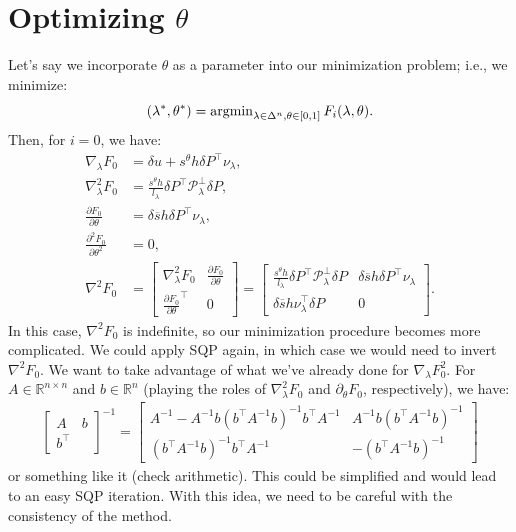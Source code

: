 \documentclass[eikonal.tex]{subfiles}
\begin{document}
\section{Optimizing $\theta$}

Let's say we incorporate $\theta$ as a parameter into our minimization
problem; i.e., we minimize:
\begin{equation}
  (\lambda^*, \theta^*) = \operatorname{argmin}_{\lambda \in \Delta^n, \theta \in [0, 1]} F_i(\lambda, \theta).
\end{equation}
Then, for $i = 0$, we have:
\begin{align*}
  \nabla_\lambda F_0 &= \delta u + s^\theta h \delta P^\top \nu_\lambda, \\
  \nabla_\lambda^2 F_0 &= \frac{s^\theta h}{l_\lambda} \delta P^\top \mathcal{P}_\lambda^\perp \delta P, \\
  \frac{\partial F_0}{\partial \theta} &= \delta \overline{s} h \delta P^\top \nu_\lambda, \\
  \frac{\partial^2 F_0}{\partial \theta^2} &= 0, \\
  \nabla^2 F_0 &= \begin{bmatrix}
    \nabla_\lambda^2 F_0 & \frac{\partial F_0}{\partial \theta} \\
    \frac{\partial F_0}{\partial \theta}^\top & 0
  \end{bmatrix} = \begin{bmatrix}
    \frac{s^\theta h}{l_\lambda} \delta P^\top \mathcal{P}_\lambda^\perp \delta P & \delta \overline{s} h \delta P^\top \nu_\lambda \\
    \delta \overline{s} h \nu_\lambda^\top \delta P  & 0
  \end{bmatrix}.
\end{align*}
In this case, $\nabla^2 F_0$ is indefinite, so our minimization
procedure becomes more complicated. We could apply SQP again, in which
case we would need to invert $\nabla^2 F_0$. We want to take advantage
of what we've already done for $\nabla_\lambda F_0^2$. For
$A \in \mathbb{R}^{n \times n}$ and $b \in \mathbb{R}^{n}$ (playing
the roles of $\nabla_\lambda^2 F_0$ and $\partial_\theta F_0$,
respectively), we have:
\begin{align*}
  \begin{bmatrix}
    A & b \\
    b^\top &
  \end{bmatrix}^{-1} = \begin{bmatrix}
    A^{-1} - A^{-1} b (b^\top A^{-1} b)^{-1} b^\top A^{-1} & A^{-1} b (b^\top A^{-1} b)^{-1} \\
    (b^\top A^{-1} b)^{-1} b^\top A^{-1} & -(b^\top A^{-1} b)^{-1}
  \end{bmatrix}
\end{align*}
or something like it (check arithmetic). This could be simplified and
would lead to an easy SQP iteration. With this idea, we need to be
careful with the consistency of the method.
\end{document}
